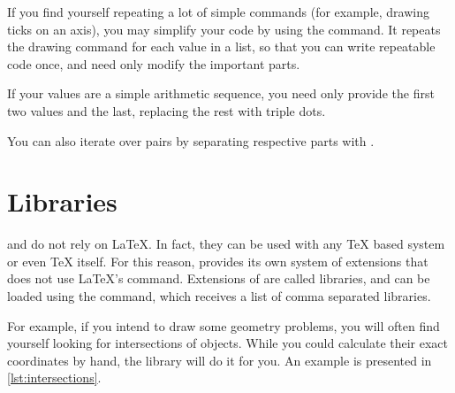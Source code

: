 If you find yourself repeating a lot of simple commands (for example, drawing
ticks on an axis), you may simplify your code by using the  command. It
repeats the drawing command for each value in a list, so that you can
write repeatable code once, and need only modify the important parts.
\begin{example}[vertical_mode, examplewidth=0.8\linewidth]
\end{example}
If your values are a simple arithmetic sequence, you need only provide the first
two values and the last, replacing the rest with triple dots.
\begin{example}[vertical_mode, examplewidth=0.8\linewidth]
\end{example}
You can also iterate over pairs by separating respective parts with \ltx{/}.
\begin{example}
\end{example}

\section{Libraries}

 and \TikZ{} do not rely on \LaTeX{}. In fact, they can be used with
any \TeX{} based system or even \TeX{} itself. For this reason, \TikZ{}
provides its own system of extensions that does not use \LaTeX{}'s
 command. Extensions of \TikZ{} are called libraries, and can be
loaded using the  command, which receives a list of comma
separated libraries.

For example, if you intend to draw some geometry problems, you will often find
yourself looking for intersections of objects. While you could calculate
their exact coordinates by hand, the  library will do it
for you. An example is presented in \autoref{lst:intersections}.

